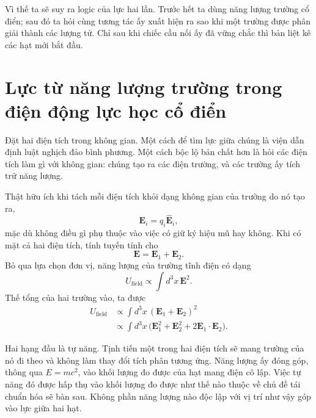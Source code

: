 Vì thế ta sẽ suy ra logic của lực hai lần. Trước hết ta dùng năng lượng trường cổ điển; sau đó ta hỏi cùng tương tác ấy xuất hiện ra sao khi một trường được phân giải thành các lượng tử. Chỉ sau khi chiếc cầu nối ấy đã vững chắc thì bản liệt kê các hạt mới bắt đầu.

\section{Lực từ năng lượng trường trong điện động lực học cổ điển}

Đặt hai điện tích trong không gian. Một cách để tìm lực giữa chúng là viện dẫn định luật nghịch đảo bình phương. Một cách bộc lộ bản chất hơn là hỏi các điện tích làm gì với không gian: chúng tạo ra các điện trường, và các trường ấy tích trữ năng lượng.

Thật hữu ích khi tách mỗi điện tích khỏi dạng không gian của trường do nó tạo ra,
\begin{equation}
\mathbf E_i=q_i\widehat{\mathbf E}_i,
\end{equation}
mặc dù không điều gì phụ thuộc vào việc có giữ ký hiệu mũ hay không. Khi có mặt cả hai điện tích, tính tuyến tính cho
\begin{equation}
\mathbf{E}=\mathbf{E}_1+\mathbf{E}_2.
\end{equation}
Bỏ qua lựa chọn đơn vị, năng lượng của trường tĩnh điện có dạng
\begin{equation}
U_{\text{field}}\propto\int d^3x\,\mathbf{E}^2.
\end{equation}
Thế tổng của hai trường vào, ta được
\begin{align}
U_{\text{field}}
&\propto\int d^3x\,(\mathbf{E}_1+\mathbf{E}_2)^2 \\
&\propto\int d^3x\,\bigl(\mathbf{E}_1^2+\mathbf{E}_2^2
  +2\mathbf{E}_1\!\cdot\!\mathbf{E}_2\bigr).
\end{align}

Hai hạng đầu là tự năng. Tịnh tiến một trong hai điện tích sẽ mang trường của nó đi theo và không làm thay đổi tích phân tương ứng. Năng lượng ấy đóng góp, thông qua \(E=mc^2\), vào khối lượng đo được của hạt mang điện cô lập. Việc tự năng đó được hấp thụ vào khối lượng đo được như thế nào thuộc về chủ đề tái chuẩn hóa sẽ bàn sau. Không phần năng lượng nào độc lập với vị trí như vậy góp vào lực giữa hai hạt.

